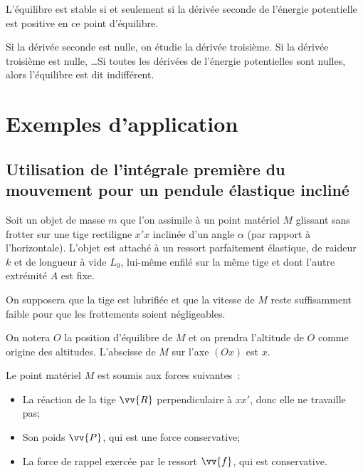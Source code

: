 L'équilibre est stable si et seulement si la dérivée seconde de l'énergie potentielle est positive en ce point d'équilibre.

Si la dérivée seconde est nulle, on étudie la dérivée troisième. Si la dérivée troisième est nulle, \ldots Si toutes les dérivées de l'énergie potentielles sont nulles, alors l'équilibre est dit indifférent.

\section{Exemples d'application}
\label{chap4-sec:exemplesdapplication}

\subsection{Utilisation de l'intégrale première du mouvement pour un pendule élastique incliné}
\label{chap4-subsec:penduleelastique}

Soit un objet de masse \(m\) que l'on assimile à un point matériel \(M\) glissant sans frotter sur une tige rectiligne \(x'x\) inclinée d'un angle \(\alpha\) (par rapport à l'horizontale). L'objet est attaché à un ressort parfaitement élastique, de raideur \(k\) et de longueur à vide \(L_0\), lui-même enfilé sur la même tige et dont l'autre extrémité \(A\) est fixe.

On supposera que la tige est lubrifiée et que la vitesse de \(M\) reste suffisamment faible pour que les frottements soient négligeables.

On notera \(O\) la position d'équilibre de \(M\) et on prendra l'altitude de \(O\) comme origine des altitudes. L'abscisse de \(M\) sur l'axe \((Ox)\) est \(x\).

Le point matériel \(M\) est soumis aux forces suivantes~:
\begin{itemize}
\item La réaction de la tige \(\vv{R}\) perpendiculaire à \(xx'\), donc elle ne travaille pas;
\item Son poids \(\vv{P}\), qui est une force conservative;
\item La force de rappel exercée par le ressort \(\vv{f}\), qui est conservative.
\end{itemize}

